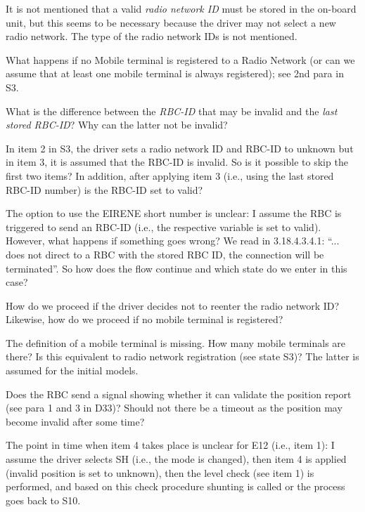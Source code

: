 \documentclass{template/openetcs_article}
\begin{document}
It is not mentioned that a valid \emph{radio network ID} must be stored in the on-board unit, but this seems to be necessary because the driver may not select a new radio network. The type of the radio network IDs is not mentioned.

What happens if no Mobile terminal is registered to a Radio Network (or can we assume that at least one mobile terminal is always registered); see 2nd para in S3.

What is the difference between the \emph{RBC-ID} that may be invalid and the \emph{last stored RBC-ID}? Why can the latter not be invalid?

In item 2 in S3, the driver sets a radio network ID and RBC-ID to unknown but in item 3, it is assumed that the RBC-ID is invalid. So is it possible to skip the first two items? In addition, after applying item 3 (i.e., using the last stored RBC-ID number) is the RBC-ID set to valid?

The option to use the EIRENE short number is unclear: I assume the RBC is triggered to send an RBC-ID (i.e., the respective variable is set to valid). However, what happens if something goes wrong? We read in 3.18.4.3.4.1:  ``... does not direct to a RBC with the stored RBC ID, the connection will be terminated''. So how does the flow continue and which state do we enter in this case?

How do we proceed if the driver decides not to reenter the radio network ID? Likewise, how do we proceed if no mobile terminal is registered?

The definition of a mobile terminal is missing. How many mobile terminals are there? Is this equivalent to radio network registration (see state S3)? The latter is assumed for the initial models.

Does the RBC send a signal showing whether it can validate the position report (see para 1 and 3 in D33)? Should not there be a timeout as the position may become invalid after some time?

\label{i:s10}
The point in time when item 4 takes place is unclear for E12 (i.e., item 1): I assume the driver selects SH (i.e., the mode is changed), then item 4 is applied (invalid position is set to unknown), then the level check (see item 1) is performed, and based on this check procedure shunting is called or the process goes back to S10. 
\end{document}
